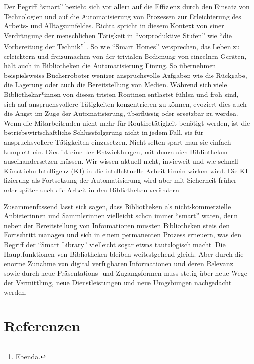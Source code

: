 \documentclass[a4paper,
fontsize=11pt,
oneside,
numbers=noperiodatend,
parskip=half-,
bibliography=totoc,
final
]{scrartcl}
\begin{document}
Der Begriff \enquote{smart} bezieht sich vor allem auf die Effizienz
durch den Einsatz von Technologien und auf die Automatisierung von
Prozessen zur Erleichterung des Arbeits- und Alltagsumfeldes. Richta
spricht in diesem Kontext von einer Verdrängung der menschlichen
Tätigkeit in \enquote{vorproduktive Stufen} wie \enquote{die
Vorbereitung der Technik}\footnote{Ebenda.}. So wie \enquote{Smart
Homes} versprechen, das Leben zu erleichtern und freizumachen von der
trivialen Bedienung von einzelnen Geräten, hält auch in Bibliotheken die
Automatisierung Einzug. So übernehmen beispielsweise Bücherroboter
weniger anspruchsvolle Aufgaben wie die Rückgabe, die Lagerung oder auch
die Bereitstellung von Medien. Während sich viele Bibliothekar*innen von
diesen tristen Routinen entlastet fühlen und froh sind, sich auf
anspruchsvollere Tätigkeiten konzentrieren zu können, evoziert dies auch
die Angst im Zuge der Automatisierung, überflüssig oder ersetzbar zu
werden. Wenn die Mitarbeitenden nicht mehr für Routinetätigkeit benötigt
werden, ist die betriebswirtschaftliche Schlussfolgerung nicht in jedem
Fall, sie für anspruchsvollere Tätigkeiten einzusetzen. Nicht selten
spart man sie einfach komplett ein. Dies ist eine der Entwicklungen, mit
denen sich Bibliotheken auseinandersetzen müssen. Wir wissen aktuell
nicht, inwieweit und wie schnell Künstliche Intelligenz (KI) in die
intellektuelle Arbeit hinein wirken wird. Die KI-fizierung als
Fortsetzung der Automatisierung wird aber mit Sicherheit früher oder
später auch die Arbeit in den Bibliotheken verändern.

Zusammenfassend lässt sich sagen, dass Bibliotheken als
nicht-kommerzielle Anbieterinnen und Sammlerinnen vielleicht schon immer
\enquote{smart} waren, denn neben der Bereitstellung von Informationen
mussten Bibliotheken stets den Fortschritt managen und sich in einem
permanenten Prozess erneuern, was den Begriff der \enquote{Smart
Library} vielleicht sogar etwas tautologisch macht. Die Hauptfunktionen
von Bibliotheken bleiben weitestgehend gleich. Aber durch die enorme
Zunahme von digital verfügbaren Informationen und deren Relevanz sowie
durch neue Präsentations- und Zugangsformen muss stetig über neue Wege
der Vermittlung, neue Dienstleistungen und neue Umgebungen nachgedacht
werden.

\hypertarget{referenzen}{%
\section{Referenzen}\label{referenzen}}
\end{document}
